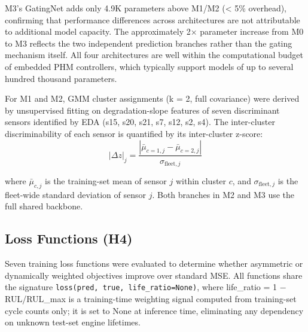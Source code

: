 \documentclass[review,12pt]{elsarticle}
\begin{document}
M3's GatingNet adds only 4.9K parameters above M1/M2 (< 5\% overhead), confirming that performance differences across architectures are not attributable to additional model capacity. The approximately 2× parameter increase from M0 to M3 reflects the two independent prediction branches rather than the gating mechanism itself. All four architectures are well within the computational budget of embedded PHM controllers, which typically support models of up to several hundred thousand parameters.

For M1 and M2, GMM cluster assignments (k = 2, full covariance) were derived by unsupervised fitting on degradation-slope features of seven discriminant sensors identified by EDA (s15, s20, s21, s7, s12, s2, s4). The inter-cluster discriminability of each sensor is quantified by its inter-cluster z-score:
\begin{equation}
|\Delta z|_j = \frac{|\bar{\mu}_{c=1,j} - \bar{\mu}_{c=2,j}|}{\sigma_{\text{fleet},j}}
\end{equation}

where $\bar{\mu}_{c,j}$ is the training-set mean of sensor $j$ within cluster $c$, and $\sigma_{\text{fleet},j}$ is the fleet-wide standard deviation of sensor $j$. Both branches in M2 and M3 use the full shared backbone.

\subsection{Loss Functions (H4)}

Seven training loss functions were evaluated to determine whether asymmetric or dynamically weighted objectives improve over standard MSE. All functions share the signature \texttt{loss(pred, true, life\_ratio=None)}, where life_ratio = 1 − RUL/RUL_max is a training-time weighting signal computed from training-set cycle counts only; it is set to None at inference time, eliminating any dependency on unknown test-set engine lifetimes.
\end{document}
